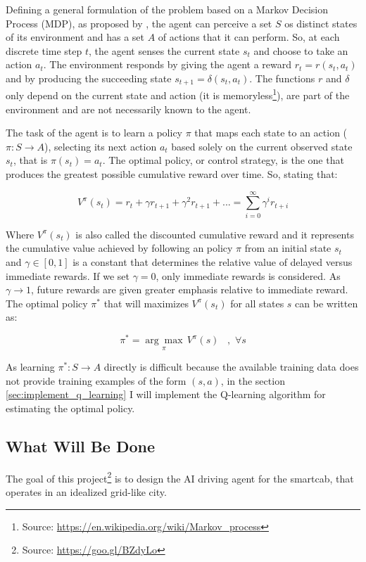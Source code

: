 \documentclass[a4paper]{article}
\begin{document}
Defining a general formulation of the problem based on a Markov Decision Process (MDP), as proposed by \cite{Mitchell}, the agent can perceive a set $S$ os distinct states of its environment and has a set $A$ of actions that it can perform. So, at each discrete time step $t$, the agent senses the current state $s_t$ and choose to take an action $a_t$. The environment responds by giving the agent a reward $r_t=r(s_t, a_t)$ and by producing the succeeding state $s_{t+1}=\delta(s_t, a_t)$. The functions $r$ and $\delta$ only depend on the current state and action (it is memoryless\footnote{Source: \url{https://en.wikipedia.org/wiki/Markov_process}}), are part of the environment and are not necessarily known to the agent.

The task of the agent is to learn a policy $\pi$ that maps each state to an action ($\pi: S \rightarrow A$), selecting its next action $a_t$ based solely on the current observed state $s_t$, that is $\pi(s_t)=a_t$. The optimal policy, or control strategy, is the one that produces the greatest possible cumulative reward over time. So, stating that:

$$V^{\pi}(s_t)= r_t + \gamma r_{t+1} + \gamma^2 r_{t+1} + ... = \sum_{i=0}^{\infty} \gamma^{i} r_{t+i}$$

Where $V^{\pi}(s_t)$ is also called the discounted cumulative reward and it represents the cumulative value achieved by following an policy $\pi$ from an initial state $s_t$ and $\gamma \in [0, 1]$ is a constant that determines the relative value of delayed versus immediate rewards. If we set $\gamma=0$, only immediate rewards is considered. As $\gamma \rightarrow 1$, future rewards are given greater emphasis relative to immediate reward. The optimal policy $\pi^{*}$ that will maximizes $V^{\pi}(s_t)$ for all states $s$ can be written as:

$$\pi^{*} = \underset{\pi}{\arg \max} \, V^{\pi} (s)\,\,\,\,\,, \,\, \forall s$$

As learning $\pi^{*}: S \rightarrow A$ directly is difficult because the available training data does not provide training examples of the form $(s, a)$, in the section \ref{sec:implement_q_learning} I will implement the Q-learning algorithm for estimating the optimal policy.

\subsection{What Will Be Done}

The goal of this project\footnote{Source: \url{https://goo.gl/BZdyLo}} is to design the AI driving agent for the smartcab, that operates in an idealized grid-like city.
\end{document}
